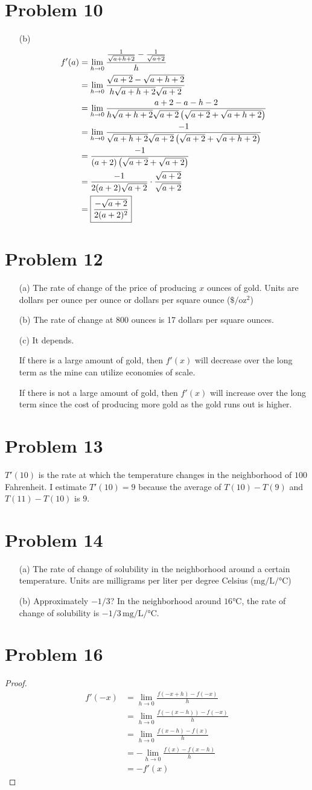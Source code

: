 \documentclass{article}
\newcommand*{\paren}[1]{\ensuremath\left(#1\right)}
\newcommand*{\problem}[1]{\section*{Problem #1}}
\newcommand*{\limit}[2][x]{\ensuremath{\displaystyle\lim_{#1\to#2}}}
\begin{document}
\problem{10}
\begin{itemize}
	\item[(b)]
	\begin{align*}
		f'(a)&=\limit[h]{0}\frac{\frac{1}{\sqrt{a+h+2}}-\frac{1}{\sqrt{a+2}}}{h} \\
		&=\limit[h]{0}\frac{\sqrt{a+2}-\sqrt{a+h+2}}{h\sqrt{a+h+2}\sqrt{a+2}} \\
		&=\limit[h]{0}\frac{a+2-a-h-2}{h\sqrt{a+h+2}\sqrt{a+2}\paren{\sqrt{a+2}+\sqrt{a+h+2}}} \\
		&=\limit[h]{0}\frac{-1}{\sqrt{a+h+2}\sqrt{a+2}\paren{\sqrt{a+2}+\sqrt{a+h+2}}} \\
		&=\frac{-1}{(a+2)\paren{\sqrt{a+2}+\sqrt{a+2}}} \\
		&=\frac{-1}{2(a+2)\sqrt{a+2}}\cdot\frac{\sqrt{a+2}}{\sqrt{a+2}} \\
		&=\boxed{\frac{-\sqrt{a+2}}{2(a+2)^2}} \\
	\end{align*}
\end{itemize}

\problem{12}
\begin{itemize}
	\item[(a)]
	The rate of change of the price of producing $x$ ounces of gold. Units are dollars per ounce per ounce or dollars per square ounce ($\$/\mathrm{oz}^2$)

	\item[(b)]
	The rate of change at 800 ounces is 17 dollars per square ounces.

	\item[(c)]
	It depends.

	If there is a large amount of gold, then $f'(x)$ will decrease over the long term as the mine can utilize economies of scale.

	If there is not a large amount of gold, then $f'(x)$ will increase over the long term since the cost of producing more gold as the gold runs out is higher.
\end{itemize}

\problem{13}
$T'(10)$ is the rate at which the temperature changes in the neighborhood of $100$ Fahrenheit. I estimate $T'(10)=9$ because the average of $T(10)-T(9)$ and $T(11)-T(10)$ is $9$.

\problem{14}
\begin{itemize}
	\item[(a)]
	The rate of change of solubility in the neighborhood around a certain temperature. Units are milligrams per liter per degree Celsius ($\mathrm{mg/L/\si{\celsius}}$)	

	\item[(b)]
	Approximately $-1/3$? In the neighborhood around $16\si{\celsius}$, the rate of change of solubility is $-1/3\,\mathrm{mg/L/\si{\celsius}}$.
\end{itemize}

\problem{16}
\begin{proof}
	\begin{align*}
		f'(-x)&=\limit[h]{0}\frac{f(-x+h)-f(-x)}{h} \\
		&=\limit[h]{0}\frac{f(-(x-h))-f(-x)}{h} \\
		&=\limit[h]{0}\frac{f(x-h)-f(x)}{h} \\
		&=-\limit[h]{0}\frac{f(x)-f(x-h)}{h} \\
		&=-f'(x)
	\end{align*}
\end{proof}
\end{document}

